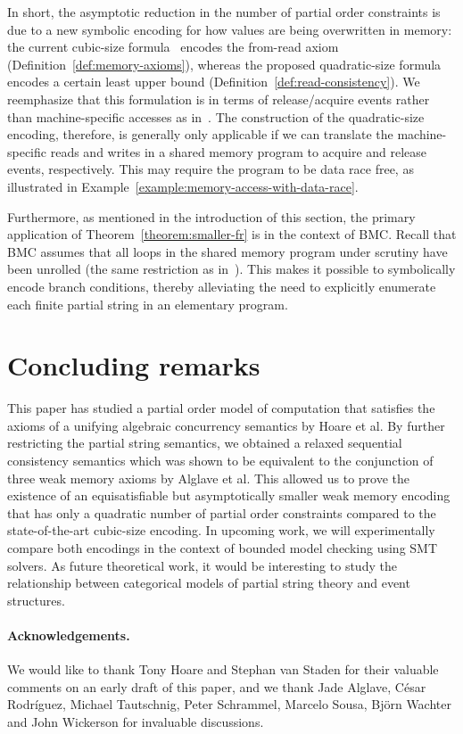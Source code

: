 \documentclass{llncs}
\begin{document}
In short, the asymptotic reduction in the number of partial order constraints is due to a new symbolic encoding for how values are being overwritten in memory: the current cubic-size formula~\cite{AKT2013} encodes the from-read axiom (Definition~\ref{def:memory-axioms}), whereas the proposed quadratic-size formula encodes a certain least upper bound (Definition~\ref{def:read-consistency}). We reemphasize that this formulation is in terms of release/acquire events rather than machine-specific accesses as in~\cite{AKT2013}. The construction of the quadratic-size encoding, therefore, is generally only applicable if we can translate the machine-specific reads and writes in a shared memory program to acquire and release events, respectively. This may require the program to be data race free, as illustrated in Example~\ref{example:memory-access-with-data-race}.

Furthermore, as mentioned in the introduction of this section, the primary application of Theorem~\ref{theorem:smaller-fr} is in the context of BMC. Recall that BMC assumes that all loops in the shared memory program under scrutiny have been unrolled (the same restriction as in~\cite{AKT2013}). This makes it possible to symbolically encode branch conditions, thereby alleviating the need to explicitly enumerate each finite partial string in an elementary program.

\section{Concluding remarks}
\vspace{-0.3em}
\label{section:concl}

This paper has studied a partial order model of computation that satisfies the axioms of a unifying algebraic concurrency semantics by Hoare et al. By further restricting the partial string semantics, we obtained a relaxed sequential consistency semantics which was shown to be equivalent to the conjunction of three weak memory axioms by Alglave et al. This allowed us to prove the existence of an equisatisfiable but asymptotically smaller weak memory encoding that has only a quadratic number of partial order constraints compared to the state-of-the-art cubic-size encoding. In upcoming work, we will experimentally compare both encodings in the context of bounded model checking using SMT solvers. As future theoretical work, it would be interesting to study the relationship between categorical models of partial string theory and event structures.

\paragraph{Acknowledgements.} We would like to thank Tony Hoare and Stephan van Staden for their valuable comments on an early draft of this paper, and we thank Jade Alglave, C\'{e}sar Rodr\'{i}guez, Michael Tautschnig, Peter Schrammel, Marcelo Sousa, Bj\"{o}rn Wachter and John Wickerson for invaluable discussions.



\end{document}
